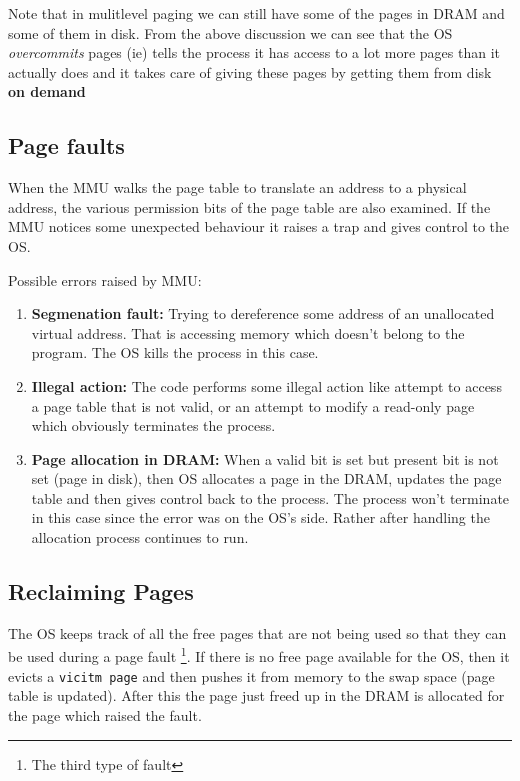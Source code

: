 \documentclass[12pt]{article}
\begin{document}
Note that in mulitlevel paging we can still have some of the pages in DRAM and some of them in disk.
From the above discussion we can see that the OS \textit{overcommits} pages (ie) tells the process it has access 
to a lot more pages than it actually does and it takes care of giving these pages by getting them from disk \textbf{on demand}



\subsection{Page faults}
When the MMU walks the page table to translate an address to a physical address, the various permission bits of the page table are also examined. 
If the MMU notices some unexpected behaviour it raises a trap and gives control to the OS.

Possible errors raised by MMU:
\begin{enumerate}[topsep=0pt, partopsep=0pt, itemsep=0pt, parsep=0pt]
    \item \textbf{Segmenation fault:} Trying to dereference some address of an unallocated virtual address. That is accessing memory which doesn't belong to the program. The OS kills the process in this case.
    \item \textbf{Illegal action:} The code performs some illegal action like attempt to access a page table that is not valid, or an attempt to modify a read-only page which obviously terminates the process.
    \item \textbf{Page allocation in DRAM:} When a valid bit is set but present bit is not set (page in disk), then OS allocates a page in the DRAM, updates the page table and then gives control back to the process.
    The process won't terminate in this case since the error was on the OS's side. Rather after handling the allocation process continues to run.
\end{enumerate}

\subsection{Reclaiming Pages}
The OS keeps track of all the free pages that are not being used so that they can be used during a page fault \footnote{The third type of fault}. If there is no free page available for the OS,
then it evicts a \texttt{vicitm page} and then pushes it from memory to the swap space (page table is updated). After this the page just freed up in the DRAM is allocated
for the page which raised the fault. 
\end{document}
